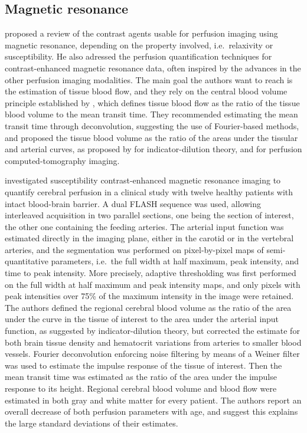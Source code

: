 \subsection{Magnetic resonance}
\citet{Rosen:1990hz} proposed a review of the contrast agents usable for perfusion imaging using magnetic resonance, depending on the property involved, i.e.~relaxivity or susceptibility. 
He also adressed the perfusion quantification techniques for contrast-enhanced magnetic resonance data, often inspired by the advances in the other perfusion imaging modalities.
The main goal the authors want to reach is the estimation of tissue blood flow, and they rely on the central blood volume principle established by \citet{Stewart:1897dz}, which defines tissue blood flow as the ratio of the tissue blood volume to the mean transit time.
They recommended estimating the mean transit time through deconvolution, suggesting the use of Fourier-based methods, and proposed the tissue blood volume as the ratio of the areas under the tissular and arterial curves, as proposed by \citet{Lassen:1979vj} for indicator-dilution theory, and \citet{Axel:1980jg} for perfusion computed-tomography imaging.

\citet{Rempp:1994kk} investigated susceptibility contrast-enhanced magnetic resonance imaging to quantify cerebral perfusion in a clinical study with twelve healthy patients with intact blood-brain barrier.
A dual FLASH sequence was used, allowing interleaved acquisition in two parallel sections, one being the section of interest, the other one containing the feeding arteries.
The arterial input function was estimated directly in the imaging plane, either in the carotid or in the vertebral arteries, and the segmentation was performed on pixel-by-pixel maps of semi-quantitative parameters, i.e.~the full width at half maximum, peak intensity, and time to peak intensity.
More precisely, adaptive thresholding was first performed on the full width at half maximum and peak intensity maps, and only pixels with peak intensities over 75\% of the maximum intensity in the image were retained.
The authors defined the regional cerebral blood volume as the ratio of the area under the curve in the tissue of interest to the area under the arterial input function, as suggested by indicator-dilution theory, but corrected the estimate for both brain tissue density and hematocrit variations from arteries to smaller blood vessels.
Fourier deconvolution enforcing noise filtering by means of a Weiner filter was used to estimate the impulse response of the tissue of interest.
Then the mean transit time was estimated as the ratio of the area under the impulse response to its height.
Regional cerebral blood volume and blood flow were estimated in both gray and white matter for every patient.
The authors report an overall decrease of both perfusion parameters with age, and suggest this explains the large standard deviations of their estimates.


